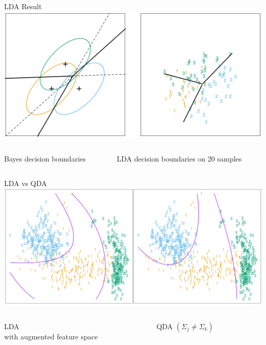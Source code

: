 \documentclass{beamer}
\begin{document}
\begin{frame}{LDA Result}
\includegraphics[width=\textwidth]{LDA_result.png}
\begin{columns}
\begin{column}{0.5\textwidth}
\begin{center}
Bayes decision boundaries
\end{center}
\end{column}
\begin{column}{0.5\textwidth}
\begin{center}
LDA decision boundaries on 20 samples
\end{center}
\end{column}
\end{columns}
\end{frame}

\begin{frame}{LDA vs QDA}
\includegraphics[width=\textwidth]{LDAQDA.png}
\begin{columns}
\begin{column}{0.5\textwidth}
\begin{center}
LDA\\ with augmented feature space
\end{center}
\end{column}
\begin{column}{0.5\textwidth}
\begin{center}
QDA $(\Sigma_j \neq \Sigma_k)$
\end{center}
\end{column}
\end{columns}
\end{frame}
\end{document}
